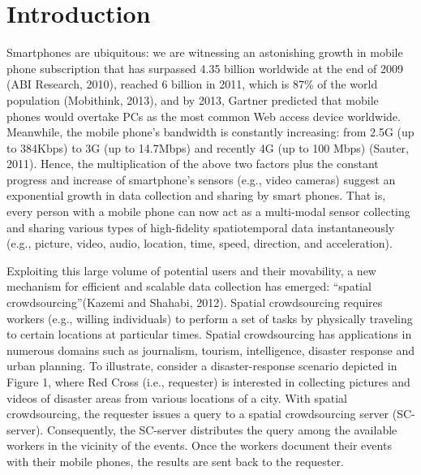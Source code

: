 \section{Introduction}

Smartphones are ubiquitous: we are witnessing an astonishing growth in mobile phone subscription that has surpassed 4.35 billion worldwide at the end of 2009 (ABI Research, 2010), reached 6 billion in 2011, which is 87\% of the world population (Mobithink, 2013), and by 2013, Gartner predicted that mobile phones would overtake PCs as the most common Web access device worldwide. Meanwhile, the mobile phone’s bandwidth is constantly increasing: from 2.5G (up to 384Kbps) to 3G (up to 14.7Mbps) and recently 4G (up to 100 Mbps) (Sauter, 2011). Hence, the multiplication of the above two factors plus the constant progress and increase of smartphone’s sensors (e.g., video cameras) suggest an exponential growth in data collection and sharing by smart phones. That is, every person with a mobile phone can now act as a multi-modal sensor collecting and sharing various types of high-fidelity spatiotemporal data instantaneously (e.g., picture, video, audio, location, time, speed, direction, and acceleration).

Exploiting this large volume of potential users and their movability, a new mechanism for efficient and scalable data collection has emerged: “spatial crowdsourcing”(Kazemi and Shahabi, 2012). Spatial crowdsourcing requires workers (e.g., willing individuals) to perform a set of tasks by physically traveling to certain locations at particular times. Spatial crowdsourcing has applications in numerous domains such as journalism, tourism, intelligence, disaster response and urban planning. To illustrate, consider a disaster-response scenario depicted in Figure 1, where Red Cross (i.e., requester) is interested in collecting pictures and videos of disaster areas from various locations of a city. With spatial crowdsourcing, the requester issues a query to a spatial crowdsourcing server (SC-server). Consequently, the SC-server distributes the query among the available workers in the vicinity of the events. Once the workers document their events with their mobile phones, the results are sent back to the requester.

